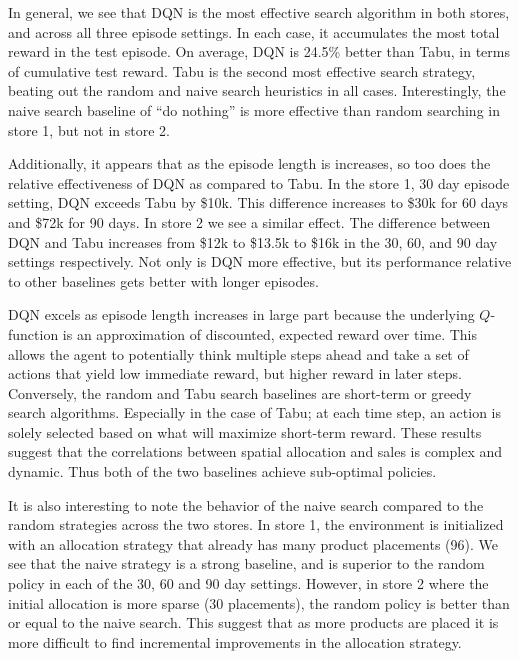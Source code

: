 In general, we see that DQN is the most effective search algorithm in both stores, and across all three episode settings. In each case, it accumulates the most total reward in the test episode. On average, DQN is 24.5\% better than Tabu, in terms of cumulative test reward. Tabu is the second most effective search strategy, beating out the random and naive search heuristics in all cases. Interestingly, the naive search baseline of ``do nothing'' is more effective than random searching in store 1, but not in store 2. 

Additionally, it appears that as the episode length is increases, so too does the relative effectiveness of DQN as compared to Tabu. In the store 1, 30 day episode setting, DQN exceeds Tabu by \$10k. This difference increases to \$30k for 60 days and \$72k for 90 days. In store 2 we see a similar effect. The difference between DQN and Tabu increases from \$12k to \$13.5k to \$16k in the 30, 60, and 90 day settings respectively. Not only is DQN more effective, but its performance relative to other baselines gets better with longer episodes. 

DQN excels as episode length increases in large part because the underlying $Q$-function is an approximation of discounted, expected reward over time. This allows the agent to potentially think multiple steps ahead and take a set of actions that yield low immediate reward, but higher reward in later steps. Conversely, the random and Tabu search baselines are short-term or greedy search algorithms. Especially in the case of Tabu; at each time step, an action is solely selected based on what will maximize short-term reward. These results suggest that the correlations between spatial allocation and sales is complex and dynamic. Thus both of the two baselines achieve sub-optimal policies.

It is also interesting to note the behavior of the naive search compared to the random strategies across the two stores. In store 1, the environment is initialized with an allocation strategy that already has many product placements (96). We see that the naive strategy is a strong baseline, and is superior to the random policy in each of the 30, 60 and 90 day settings. However, in store 2 where the initial allocation is more sparse (30 placements), the random policy is better than or equal to the naive search. This suggest that as more products are placed it is more difficult to find incremental improvements in the allocation strategy. 



